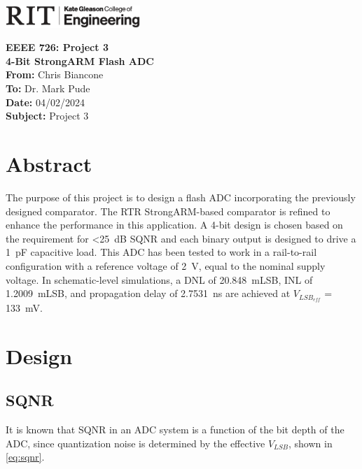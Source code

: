 \documentclass[11pt,letterpaper]{article}
\begin{document}
\VerbatimFootnotes %


	\hspace{4.5in}
	\includegraphics[width=2in,trim=0cm 0in 0in 0.0in,clip]{kgcoelogo2019horiz.eps}
\newline

\Huge\textbf{EEEE 726: Project 3 \\4-Bit StrongARM Flash ADC}\\

\Large
\textbf{From:} Chris Biancone \\
\textbf{To: } Dr. Mark Pude \\
\textbf{Date: } 04/02/2024 \\
\textbf{Subject: } Project 3\\
\vspace{0.5in}

\section*{Abstract}
\normalsize
The purpose of this project is to design a flash ADC incorporating the previously designed comparator. The RTR StrongARM-based comparator is refined to enhance the performance in this application. A 4-bit design is chosen based on the requirement for <\qty{25}{\dB} SQNR and each binary output is designed to drive a \qty{1}{\pF} capacitive load. This ADC has been tested to work in a rail-to-rail configuration with a reference voltage of \qty{2}{\V}, equal to the nominal supply voltage. In schematic-level simulations, a DNL of \qty{20.848}{mLSB}, INL of \qty{1.2009}{mLSB}, and propagation delay of \qty{2.7531}{\ns} are achieved at \(V_{LSB_{eff}}\) = \qty{133}{\mV}.

\section{Design}

\subsection{SQNR}

It is known that SQNR in an ADC system is a function of the bit depth of the ADC, since quantization noise is determined by the effective \(V_{LSB}\), shown in \cref{eq:sqnr}.
\end{document}

